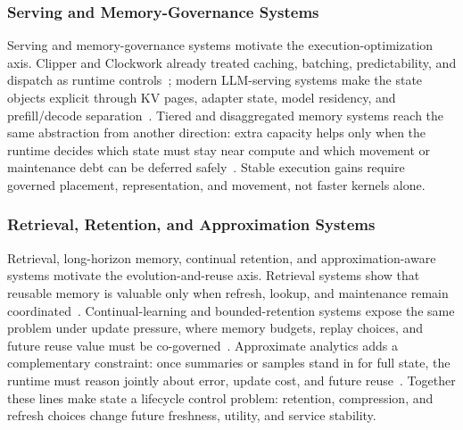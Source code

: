 \documentclass[manuscript]{acmart}
\begin{document}
\subsubsection{Serving and Memory-Governance Systems}

Serving and memory-governance systems motivate the execution-optimization axis. Clipper and Clockwork already treated caching, batching, predictability, and dispatch as runtime controls~\cite{crankshaw2017clipper,gujarati2020clockwork}; modern LLM-serving systems make the state objects explicit through KV pages, adapter state, model residency, and prefill/decode separation~\cite{kwon2023pagedattention,sheng2023slora,zheng2023sglang,agrawal2024sarathi,zhong2024distserve,patel2024splitwise,yu2025prism,zhang2025jenga}. Tiered and disaggregated memory systems reach the same abstraction from another direction: extra capacity helps only when the runtime decides which state must stay near compute and which movement or maintenance debt can be deferred safely~\cite{hu2024aceso,zhong2024unimem,jalalian2024extmem,raybuck2021hemem,cho2024coaxial,zhao2025equilibria,peng2024scalacache,wang2025finemem,chang2024gmt,li2024streamcache,qiu2025hotrap}. Stable execution gains require governed placement, representation, and movement, not faster kernels alone.

\subsubsection{Retrieval, Retention, and Approximation Systems}

Retrieval, long-horizon memory, continual retention, and approximation-aware systems motivate the evolution-and-reuse axis. Retrieval systems show that reusable memory is valuable only when refresh, lookup, and maintenance remain coordinated~\cite{guu2020realm,lewis2020rag,borgeaud2022retro,izacard2022atlas,asai2024selfrag,wang2024hipporag,sarthi2024raptor}. Continual-learning and bounded-retention systems expose the same problem under update pressure, where memory budgets, replay choices, and future reuse value must be co-governed~\cite{kirkpatrick2017ewc,lopez2017gem,rebuffi2017icarl,chaudhry2019agem,rolnick2019experience,aljundi2019mir,buzzega2020der,hayes2020remind,prabhu2020gdumb,delange2021survey}. Approximate analytics adds a complementary constraint: once summaries or samples stand in for full state, the runtime must reason jointly about error, update cost, and future reuse~\cite{agarwal2013blinkdb,goiri2015approxhadoop,wang2018approxjoin,hu2018streamapprox,chen2018incapprox}. Together these lines make state a lifecycle control problem: retention, compression, and refresh choices change future freshness, utility, and service stability.
\end{document}

